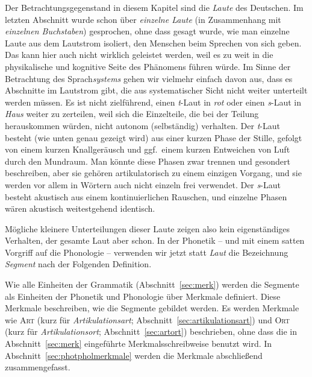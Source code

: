 Der Betrachtungsgegenstand in diesem Kapitel sind die \textit{Laute} des Deutschen.
Im letzten Abschnitt wurde schon über \textit{einzelne Laute} (in Zusammenhang mit \textit{einzelnen Buchstaben}) gesprochen, ohne dass gesagt wurde, wie man einzelne Laute aus dem Lautstrom isoliert, den Menschen beim Sprechen von sich geben.
Das kann hier auch nicht wirklich geleistet werden, weil es zu weit in die physikalische und kognitive Seite des Phänomens führen würde.
Im Sinne der Betrachtung des Sprach\textit{systems} gehen wir vielmehr einfach davon aus, dass es Abschnitte im Lautstrom gibt, die aus systematischer Sicht nicht weiter unterteilt werden müssen.
Es ist \zB nicht zielführend, einen \textit{t}-Laut in \textit{rot} oder einen \textit{s}-Laut in \textit{Haus} weiter zu zerteilen, weil sich die Einzelteile, die bei der Teilung herauskommen würden, nicht autonom (selbständig) verhalten.
Der \textit{t}-Laut besteht (wie unten genau gezeigt wird) aus einer kurzen Phase der Stille, gefolgt von einem kurzen Knallgeräusch und ggf.\ einem kurzen Entweichen von Luft durch den Mundraum.
Man könnte diese Phasen zwar trennen und gesondert beschreiben, aber sie gehören artikulatorisch zu einem einzigen Vorgang, und sie werden vor allem in Wörtern auch nicht einzeln frei verwendet.
Der \textit{s}-Laut besteht akustisch aus einem kontinuierlichen Rauschen, und einzelne Phasen wären akustisch weitestgehend identisch.

Mögliche kleinere Unterteilungen dieser Laute zeigen also kein eigenständiges Verhalten, der gesamte Laut aber schon.
In der Phonetik -- und mit einem satten Vorgriff auf die Phonologie -- verwenden wir jetzt statt \textit{Laut} die Bezeichnung \textit{Segment} nach der Folgenden Definition.


Wie alle Einheiten der Grammatik (Abschnitt~\ref{sec:merk}) werden die Segmente als Einheiten der Phonetik und Phonologie über Merkmale definiert.
Diese Merkmale beschreiben, wie die Segmente gebildet werden.
Es werden Merkmale wie \textsc{Art} (kurz für \textit{Artikulationsart}; Abschnitt~\ref{sec:artikulationsart}) und \textsc{Ort} (kurz für \textit{Artikulationsort}; Abschnitt~\ref{sec:artort}) beschrieben, ohne dass die in Abschnitt~\ref{sec:merk} eingeführte Merkmalsschreibweise benutzt wird.
In Abschnitt~\ref{sec:photpholmerkmale} werden die Merkmale abschließend zusammengefasst.


